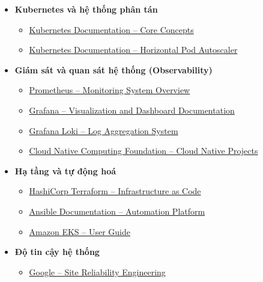 \begin{itemize}
    \item \textbf{Kubernetes và hệ thống phân tán}
    \begin{itemize}
        \item \href{https://kubernetes.io/docs/concepts/}
        {Kubernetes Documentation – Core Concepts}
        
        \item \href{https://kubernetes.io/docs/tasks/run-application/horizontal-pod-autoscale/}
        {Kubernetes Documentation – Horizontal Pod Autoscaler}
        
    \end{itemize}

    \item \textbf{Giám sát và quan sát hệ thống (Observability)}
    \begin{itemize}
        \item \href{https://prometheus.io/docs/introduction/overview/}
        {Prometheus – Monitoring System Overview}
        
        \item \href{https://grafana.com/docs/}
        {Grafana – Visualization and Dashboard Documentation}
        
        \item \href{https://grafana.com/oss/loki/}
        {Grafana Loki – Log Aggregation System}
        
        \item \href{https://www.cncf.io/projects/}
        {Cloud Native Computing Foundation – Cloud Native Projects}
    \end{itemize}

    \item \textbf{Hạ tầng và tự động hoá}
    \begin{itemize}
        \item \href{https://developer.hashicorp.com/terraform/intro}
        {HashiCorp Terraform – Infrastructure as Code}
        
        \item \href{https://docs.ansible.com/}
        {Ansible Documentation – Automation Platform}
        
        \item \href{https://docs.aws.amazon.com/eks/latest/userguide/what-is-eks.html}
        {Amazon EKS – User Guide}
    \end{itemize}

    \item \textbf{Độ tin cậy hệ thống}
    \begin{itemize}
        \item \href{https://sre.google/books/}
        {Google – Site Reliability Engineering}
    \end{itemize}
\end{itemize}
